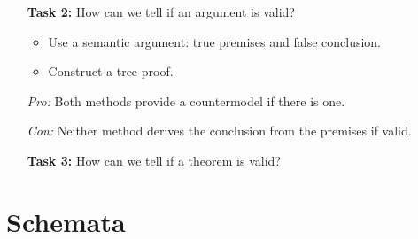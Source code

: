 \documentclass[a4paper, 11pt]{article} %
\begin{document}
\begin{enumerate}
  \item[\bf Task 2:] How can we tell if an argument is valid? 
    \begin{itemize}
      \item Use a semantic argument: true premises and false conclusion. 
      \item Construct a tree proof.
    \end{itemize}
      \item[\it Pro:] Both methods provide a countermodel if there is one.
      \item[\it Con:] Neither method derives the conclusion from the premises if valid.
    \item[\bf Task 3:] How can we tell if a theorem is valid?
\end{enumerate}



\section*{Schemata}
\end{document}
